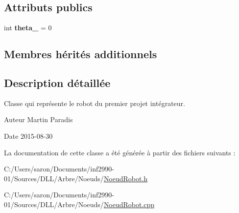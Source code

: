 \subsection*{Attributs publics}
\begin{DoxyCompactItemize}
\item 
\hypertarget{class_noeud_robot_a0b67292ea8366bfa2b676358df2596b7}{int {\bfseries theta\-\_\-} = 0}\label{class_noeud_robot_a0b67292ea8366bfa2b676358df2596b7}

\end{DoxyCompactItemize}
\subsection*{Membres hérités additionnels}


\subsection{Description détaillée}
Classe qui représente le robot du premier projet intégrateur. 

\begin{DoxyAuthor}{Auteur}
Martin Paradis 
\end{DoxyAuthor}
\begin{DoxyDate}{Date}
2015-\/08-\/30 
\end{DoxyDate}


La documentation de cette classe a été générée à partir des fichiers suivants \-:\begin{DoxyCompactItemize}
\item 
C\-:/\-Users/saron/\-Documents/inf2990-\/01/\-Sources/\-D\-L\-L/\-Arbre/\-Noeuds/\hyperlink{_noeud_robot_8h}{Noeud\-Robot.\-h}\item 
C\-:/\-Users/saron/\-Documents/inf2990-\/01/\-Sources/\-D\-L\-L/\-Arbre/\-Noeuds/\hyperlink{_noeud_robot_8cpp}{Noeud\-Robot.\-cpp}\end{DoxyCompactItemize}
